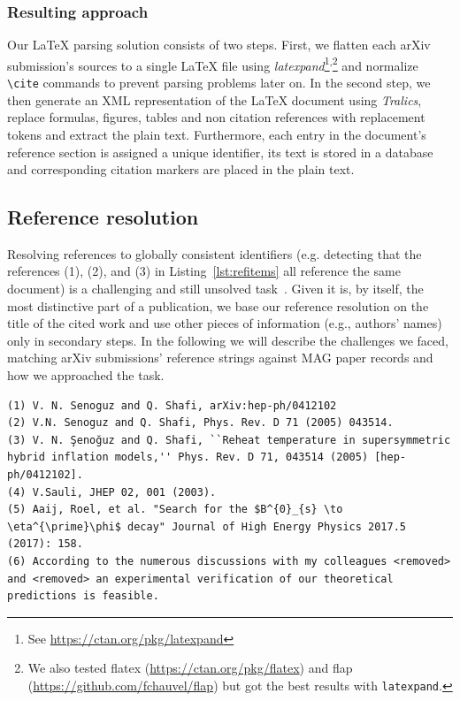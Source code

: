 \subsubsection{Resulting approach}
Our \LaTeX{} parsing solution consists of two steps. First, we flatten each arXiv submission's sources to a single \LaTeX{} file using \textit{latexpand}\footnote{See \url{https://ctan.org/pkg/latexpand}}\textsuperscript{,}\footnote{We also tested flatex (\url{https://ctan.org/pkg/flatex}) and flap (\url{https://github.com/fchauvel/flap}) but got the best results with \texttt{latexpand}.} and normalize \texttt{\textbackslash cite} commands to prevent parsing problems later on. In the second step, we then generate an XML representation of the \LaTeX{} document using \textit{Tralics}, replace formulas, figures, tables and non citation references with replacement tokens and extract the plain text. Furthermore, each entry in the document's reference section is assigned a unique identifier, its text is stored in a database and corresponding citation markers are placed in the plain text.

\subsection{Reference resolution}\label{sec:refresol}
Resolving references to globally consistent identifiers (e.g. detecting that the references (1), (2), and (3) in Listing~\ref{lst:refitems} all reference the same document) is a challenging and still unsolved task~\cite{Nasar2018}. Given it is, by itself, the most distinctive part of a publication, we base our reference resolution on the title of the cited work and use other pieces of information (e.g., authors' names) only in secondary steps. In the following we will describe the challenges we faced, matching arXiv submissions' reference strings against MAG paper records and how we approached the task.

\begin{lstlisting}[caption={Examples of reference strings.},label={lst:refitems}]
(1) V. N. Senoguz and Q. Shafi, arXiv:hep-ph/0412102
(2) V.N. Senoguz and Q. Shafi, Phys. Rev. D 71 (2005) 043514.
(3) V. N. Şenoğuz and Q. Shafi, ``Reheat temperature in supersymmetric hybrid inflation models,'' Phys. Rev. D 71, 043514 (2005) [hep-ph/0412102].
(4) V.Sauli, JHEP 02, 001 (2003).
(5) Aaij, Roel, et al. "Search for the $B^{0}_{s} \to \eta^{\prime}\phi$ decay" Journal of High Energy Physics 2017.5 (2017): 158.
(6) According to the numerous discussions with my colleagues <removed> and <removed> an experimental verification of our theoretical predictions is feasible.
\end{lstlisting} %

